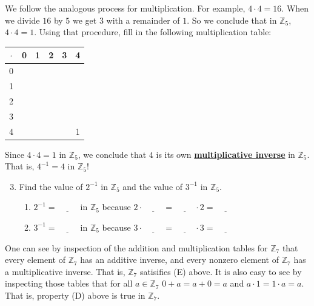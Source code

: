 \documentclass[11pt]{article}
\newenvironment{task}
	{\begin{mdframed}[linecolor=lightgray, linewidth=3pt]\raggedright}
	{\end{mdframed}}
\renewcommand\emph[1]{\underline{\bf{#1}}} %
\theoremstyle{definition}
\begin{document}
\begin{task}
  We follow the analogous process for multiplication. For example, $4 \cdot 4 = 16$. When we divide $16$ by $5$ we get $3$ with a remainder of $1$. So we
  conclude that in $\mathbb{Z}_5$, $4 \cdot 4 = 1$. Using that procedure, fill in the following multiplication table:

  \begin{center}
    \begin{tabular}{|c|c|c|c|c|c|}\\ \hline
      $\cdot$ & 0 & 1 & 2 & 3 & 4 \\ \hline
      0   &   &   &   &   &   \\ \hline
      1   &   &   &   &   &   \\ \hline
      2   &   &   &   &   &   \\ \hline
      3   &   &   &   &   &   \\ \hline
      4   &   &   &   &   & 1 \\ \hline
    \end{tabular}
  \end{center}

  Since $4\cdot 4 = 1$ in $\mathbb{Z}_5$, we conclude that $4$ is its own \emph{multiplicative inverse} in $\mathbb{Z}_5$. That is, $4^{-1}=4$ in $\mathbb{Z}_5$!

    \begin{enumerate}
        \setcounter{enumi}{2}
      \item Find the value of $2^{-1}$ in $\mathbb{Z}_5$ and the value of $3^{-1}$ in $\mathbb{Z}_5$. 
        \begin{enumerate}
          \item $2^{-1}=\underline{\hspace{1cm}}$ in $\mathbb{Z}_5$ because $2\cdot \underline{\hspace{1cm}} = \underline{\hspace{1cm}}\cdot 2 = \underline{\hspace{1cm}}$
          \item $3^{-1}=\underline{\hspace{1cm}}$ in $\mathbb{Z}_5$ because $3\cdot \underline{\hspace{1cm}} = \underline{\hspace{1cm}}\cdot 3 = \underline{\hspace{1cm}}$
        \end{enumerate}
    \end{enumerate}

    One can see by inspection of the addition and multiplication tables for $\mathbb{Z}_7$ that every element of $\mathbb{Z}_7$ has an additive inverse, and
    every nonzero element of $\mathbb{Z}_7$ has a multiplicative inverse. That is, $\mathbb{Z}_7$ satisifies (E) above. It is also easy to see by 
    inspecting those tables that for all $a\in \mathbb{Z}_7$ $0+a=a+0 = a$ and $a\cdot 1 = 1 \cdot a = a$. That is, property (D) above is true 
    in $\mathbb{Z}_7$. 


\end{task}
\end{document}
